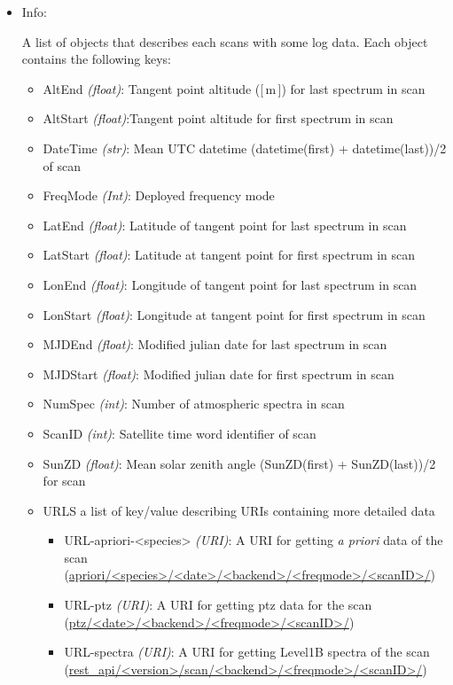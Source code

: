 \begin{itemize}
    \item Info:

        A list of objects that describes each scans
        with some log data.  
        Each object contains the following keys:

        \begin{itemize}
            \item AltEnd \emph{(float)}: Tangent point altitude ([\,m\,]) for last spectrum in scan
            \item AltStart \emph{(float)}:Tangent point altitude for first spectrum in scan
            \item DateTime \emph{(str)}: Mean UTC datetime (datetime(first) + datetime(last))/2 of scan
            \item FreqMode \emph{(Int)}: Deployed frequency mode
            \item LatEnd \emph{(float)}: Latitude of tangent point for last spectrum in scan
            \item LatStart \emph{(float)}: Latitude at tangent point for first spectrum in scan
            \item LonEnd \emph{(float)}: Longitude of tangent point for last spectrum in scan
            \item LonStart \emph{(float)}: Longitude at tangent point for first spectrum in scan
            \item MJDEnd \emph{(float)}: Modified julian date for last spectrum in scan
            \item MJDStart \emph{(float)}: Modified julian date for first spectrum in scan
            \item NumSpec \emph{(int)}: Number of atmospheric spectra in scan
            \item ScanID \emph{(int)}: Satellite time word identifier of scan
            \item SunZD \emph{(float)}: Mean solar zenith angle  (SunZD(first) + SunZD(last))/2 for scan
            \item URLS a list of key/value describing URIs containing
            more detailed data
            \begin{itemize} 
                \item URL-apriori-<species> \emph{(URI)}: 
                A URI for getting \textit{a priori} data of the scan\\
                (\url{apriori/<species>/<date>/<backend>/<freqmode>/<scanID>/})
                \item URL-ptz \emph{(URI)}: A URI for getting ptz data for the scan\\
                (\url{ptz/<date>/<backend>/<freqmode>/<scanID>/})
                \item URL-spectra \emph{(URI)}: A URI for getting Level1B spectra of the scan\\         
                (\url{rest_api/<version>/scan/<backend>/<freqmode>/<scanID>/})        
            \end{itemize}
       \end{itemize}   
\end{itemize}

